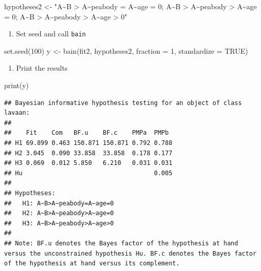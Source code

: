 \documentclass[
]{book}
\newenvironment{Shaded}{\begin{snugshade}}{\end{snugshade}}
\newcommand{\AttributeTok}[1]{\textcolor[rgb]{0.77,0.63,0.00}{#1}}
\newcommand{\ConstantTok}[1]{\textcolor[rgb]{0.00,0.00,0.00}{#1}}
\newcommand{\DecValTok}[1]{\textcolor[rgb]{0.00,0.00,0.81}{#1}}
\newcommand{\FunctionTok}[1]{\textcolor[rgb]{0.00,0.00,0.00}{#1}}
\newcommand{\NormalTok}[1]{#1}
\newcommand{\OtherTok}[1]{\textcolor[rgb]{0.56,0.35,0.01}{#1}}
\newcommand{\StringTok}[1]{\textcolor[rgb]{0.31,0.60,0.02}{#1}}
\providecommand{\tightlist}{%
  \setlength{\itemsep}{0pt}\setlength{\parskip}{0pt}}
\begin{document}
\begin{Shaded}
\begin{Highlighting}[]
\NormalTok{hypotheses2 }\OtherTok{\textless{}{-}} \StringTok{"A\textasciitilde{}B \textgreater{} A\textasciitilde{}peabody = A\textasciitilde{}age = 0; }
\StringTok{               A\textasciitilde{}B \textgreater{} A\textasciitilde{}peabody \textgreater{} A\textasciitilde{}age = 0; }
\StringTok{A\textasciitilde{}B \textgreater{} A\textasciitilde{}peabody \textgreater{} A\textasciitilde{}age \textgreater{} 0"}
\end{Highlighting}
\end{Shaded}

\begin{enumerate}
\def\labelenumi{\arabic{enumi})}
\setcounter{enumi}{2}
\tightlist
\item
  Set seed and call \texttt{bain}
\end{enumerate}

\begin{Shaded}
\begin{Highlighting}[]
\FunctionTok{set.seed}\NormalTok{(}\DecValTok{100}\NormalTok{)}
\NormalTok{y }\OtherTok{\textless{}{-}} \FunctionTok{bain}\NormalTok{(fit2, hypotheses2, }\AttributeTok{fraction =} \DecValTok{1}\NormalTok{, }\AttributeTok{standardize =} \ConstantTok{TRUE}\NormalTok{)}
\end{Highlighting}
\end{Shaded}

\begin{enumerate}
\def\labelenumi{\arabic{enumi})}
\setcounter{enumi}{3}
\tightlist
\item
  Print the results
\end{enumerate}

\begin{Shaded}
\begin{Highlighting}[]
\FunctionTok{print}\NormalTok{(y)}
\end{Highlighting}
\end{Shaded}

\begin{verbatim}
## Bayesian informative hypothesis testing for an object of class lavaan:
## 
##    Fit    Com   BF.u    BF.c    PMPa  PMPb 
## H1 69.899 0.463 150.871 150.871 0.792 0.788
## H2 3.045  0.090 33.858  33.858  0.178 0.177
## H3 0.069  0.012 5.850   6.210   0.031 0.031
## Hu                                    0.005
## 
## Hypotheses:
##   H1: A~B>A~peabody=A~age=0
##   H2: A~B>A~peabody>A~age=0
##   H3: A~B>A~peabody>A~age>0
## 
## Note: BF.u denotes the Bayes factor of the hypothesis at hand versus the unconstrained hypothesis Hu. BF.c denotes the Bayes factor of the hypothesis at hand versus its complement.
\end{verbatim}
\end{document}
